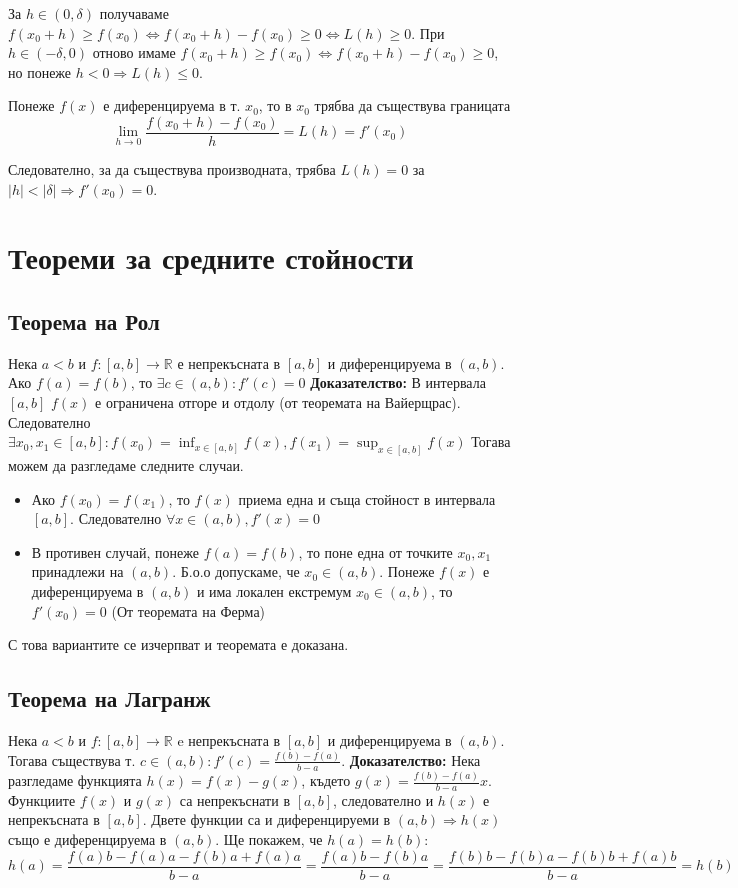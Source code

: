 \documentclass[fleqn,12pt]{article}
\begin{document}
За $h \in (0, \delta)$ получаваме $f(x_0 + h) \geq f(x_0) \Leftrightarrow f(x_0 + h) - f(x_0) \geq 0 \Leftrightarrow L(h) \geq 0$.
При $h \in (-\delta, 0)$ отново имаме $f(x_0 + h) \geq f(x_0) \Leftrightarrow f(x_0 + h) - f(x_0) \geq 0$,
но понеже $h < 0 \Rightarrow L(h) \leq 0$.

Понеже $f(x)$ е диференцируема в т. $x_0$, то в $x_0$ трябва да съществува границата
\[ \lim_{h \to 0} \frac{ f(x_0 + h)-f(x_0)}{h} = L(h) = f'(x_0) \]

Следователно, за да съществува производната, трябва $L(h) = 0$ за $|h| < |\delta| \Rightarrow f'(x_0) = 0$.

\section{Теореми  за  средните  стойности}
\subsection{Теорема на Рол}
Нека $a<b$ и $f:[a,b]\rightarrow\mathbb{R}$ е непрекъсната в $[a,b]$ и диференцируема в $(a,b)$. Ако $f(a) = f(b)$, то $\exists c \in (a,b): f'(c)=0$
\bigbreak
\textbf{Доказателство:}
В интервала $[a,b]$ $f(x)$ е ограничена отгоре и отдолу (от теоремата на Вайерщрас).
Следователно $\exists x_0,x_1 \in [a,b]: f(x_0)=\inf_{x \in [a,b]} f(x), f(x_1)=\sup_{x \in [a,b]} f(x)$
Тогава можем да разгледаме следните случаи.
\begin{itemize}
    \item Ако $f(x_0) = f(x_1)$, то $f(x)$ приема една и съща стойност в интервала $[a,b]$. Следователно $\forall x \in (a,b), f'(x)=0$ 

    \item В противен случай, понеже $f(a) = f(b)$, то поне една от точките $x_0,x_1$ принадлежи на $(a,b)$. Б.о.о допускаме, че $x_0 \in (a,b)$. Понеже $f(x)$ е диференцируема в $(a,b)$ и има локален екстремум $x_0 \in (a,b)$, то $f'(x_0) = 0$ (От теоремата на Ферма) 
\end{itemize}
С това вариантите се изчерпват и теоремата е доказана.

\subsection{Теорема на Лагранж}
Нека $a<b$ и $f:[a,b]\rightarrow\mathbb{R}$ e непрекъсната в $[a,b]$ и диференцируема в $(a,b)$.
Тогава съществува т. $c \in (a,b): f'(c) = \frac{f(b)-f(a)}{b-a}$.
\bigbreak
\textbf{Доказателство:}
Нека разгледаме функцията $h(x)=f(x) - g(x)$, където $g(x) = \frac{f(b)-f(a)}{b-a}x$. Функциите $f(x)$ и $g(x)$ са непрекъснати в $[a,b]$, 
следователно и $h(x)$ е непрекъсната в $[a,b]$. Двете функции са и диференцируеми в $(a,b) \Rightarrow h(x)$ също е диференцируема в $(a,b)$.
Ще покажем, че $h(a) = h(b)$: 
\[ h(a)=\frac{f(a)b - f(a)a - f(b)a + f(a)a}{b-a} = \frac{f(a)b-f(b)a}{b-a} = \frac{f(b)b - f(b)a - f(b)b + f(a)b}{b-a} = h(b) \]
\end{document}
